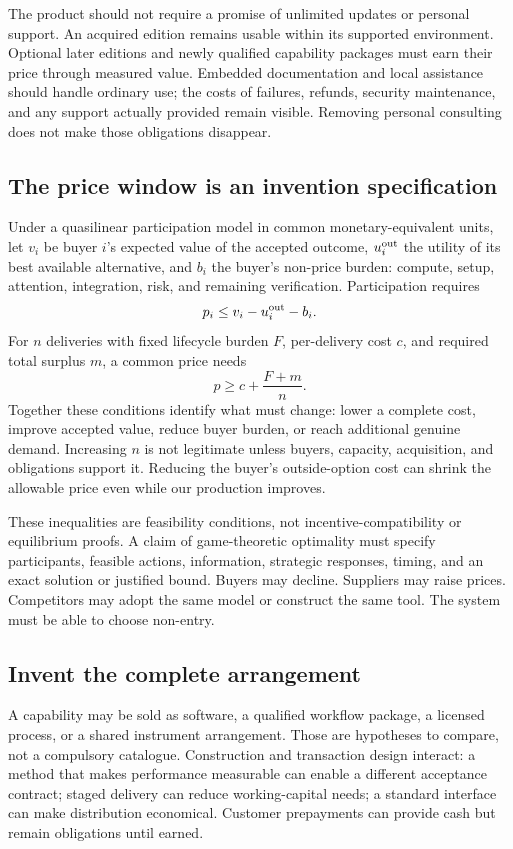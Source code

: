 \documentclass[11pt,letterpaper]{article}
\theoremstyle{remark}\newtheorem{remark}{Remark}[section]
\begin{document}
The product should not require a promise of unlimited updates or personal support. An acquired edition remains usable within its supported environment. Optional later editions and newly qualified capability packages must earn their price through measured value. Embedded documentation and local assistance should handle ordinary use; the costs of failures, refunds, security maintenance, and any support actually provided remain visible. Removing personal consulting does not make those obligations disappear.

\subsection{The price window is an invention specification}
Under a quasilinear participation model in common monetary-equivalent units, let $v_i$ be buyer $i$'s expected value of the accepted outcome, $u_i^{\rm out}$ the utility of its best available alternative, and $b_i$ the buyer's non-price burden: compute, setup, attention, integration, risk, and remaining verification. Participation requires
\begin{equation}
p_i\leq v_i-u_i^{\rm out}-b_i.
\label{eq:buyer}
\end{equation}
For $n$ deliveries with fixed lifecycle burden $F$, per-delivery cost $c$, and required total surplus $m$, a common price needs
\begin{equation}
p\geq c+\frac{F+m}{n}.
\label{eq:seller}
\end{equation}
Together these conditions identify what must change: lower a complete cost, improve accepted value, reduce buyer burden, or reach additional genuine demand. Increasing $n$ is not legitimate unless buyers, capacity, acquisition, and obligations support it. Reducing the buyer's outside-option cost can shrink the allowable price even while our production improves.

These inequalities are feasibility conditions, not incentive-compatibility or equilibrium proofs. A claim of game-theoretic optimality must specify participants, feasible actions, information, strategic responses, timing, and an exact solution or justified bound. Buyers may decline. Suppliers may raise prices. Competitors may adopt the same model or construct the same tool. The system must be able to choose non-entry.

\subsection{Invent the complete arrangement}
A capability may be sold as software, a qualified workflow package, a licensed process, or a shared instrument arrangement. Those are hypotheses to compare, not a compulsory catalogue. Construction and transaction design interact: a method that makes performance measurable can enable a different acceptance contract; staged delivery can reduce working-capital needs; a standard interface can make distribution economical. Customer prepayments can provide cash but remain obligations until earned.
\end{document}
